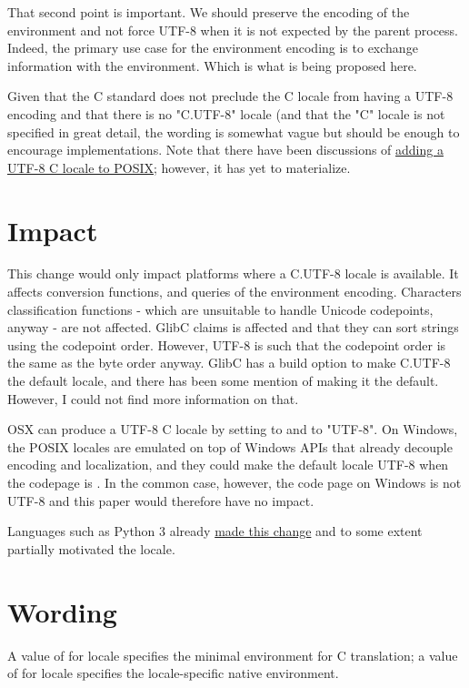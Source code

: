 \documentclass{wg21}
\begin{document}
That second point is important. We should preserve the encoding of the environment and not force UTF-8 when it is not expected by the parent process.
Indeed, the primary use case for the environment encoding is to exchange information with the environment.
Which is what is being proposed here.

Given that the C standard does not preclude the C locale from having a UTF-8 encoding and that there is no "C.UTF-8" locale (and that the "C" locale is not specified in great detail, the wording is somewhat vague but should be enough to encourage implementations.
Note that there have been discussions of \href{https://www.austingroupbugs.net/view.php?id=1548}{adding a UTF-8 C locale to POSIX}; however, it has yet to materialize.

\section{Impact}

This change would only impact platforms where a C.UTF-8 locale is available.
It affects conversion functions, and queries of the environment encoding. Characters classification functions - which are unsuitable to handle
Unicode codepoints, anyway - are not affected.
GlibC claims  is affected and that they can sort strings using the codepoint order. However, UTF-8 is such that the codepoint order is the same as the byte order anyway.
GlibC has a build option to make C.UTF-8 the default locale, and there has been some mention of making it the default. However, I could not find more information on that.

OSX can produce a UTF-8 C locale by setting  to  and  to "UTF-8".
On Windows, the POSIX locales are emulated on top of Windows APIs that already decouple encoding and localization, and they could make the default locale UTF-8 when the codepage is .
In the common case, however, the code page on Windows is not UTF-8 and this paper would therefore have no impact.

Languages such as Python 3 already \href{https://peps.python.org/pep-0538/}{made this change} and to some extent partially motivated the 
locale.

\section{Wording}


A value of  for locale specifies the minimal environment for C translation; a value of  for
locale specifies the locale-specific native environment.
\end{document}

